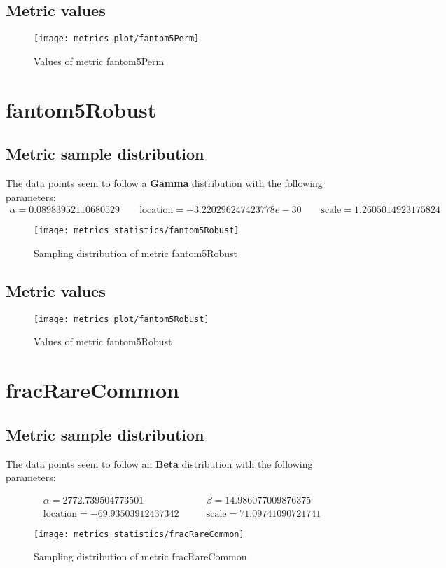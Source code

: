 \documentclass[\main/main.tex]{subfiles}
\begin{document}
\subsection{Metric values}
\begin{figure}
  \texttt{[image: metrics\_plot/fantom5Perm]}
  \caption{Values of metric fantom5Perm}
\end{figure}

\clearpage
\section{fantom5Robust}
\subsection{Metric sample distribution}
The data points seem to follow a \textbf{Gamma} distribution with the following parameters:
\begin{align*}
  \alpha   = 0.08983952110680529    \qquad  \text{location} = -3.220296247423778e-30 \qquad \text{scale} = 1.2605014923175824
\end{align*}
\begin{figure}
  \texttt{[image: metrics\_statistics/fantom5Robust]}
  \caption{Sampling distribution of metric fantom5Robust}
\end{figure}
\subsection{Metric values}
\begin{figure}
  \texttt{[image: metrics\_plot/fantom5Robust]}
  \caption{Values of metric fantom5Robust}
\end{figure}

\clearpage
\section{fracRareCommon}
\subsection{Metric sample distribution}
The data points seem to follow an \textbf{Beta} distribution with the following parameters:

\begin{align*}
  \alpha   = 2772.739504773501         & \qquad  \beta = 14.986077009876375      \\
  \text{location} = -69.93503912437342 & \qquad \text{scale} = 71.09741090721741
\end{align*}
\begin{figure}
  \texttt{[image: metrics\_statistics/fracRareCommon]}
  \caption{Sampling distribution of metric fracRareCommon}
\end{figure}
\end{document}
